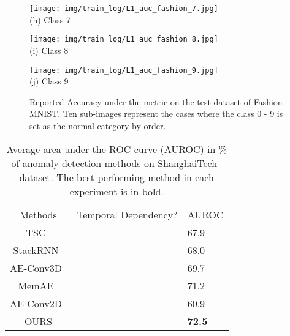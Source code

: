 \documentclass[journal]{IEEEtran}
\begin{document}
\begin{figure}[htbp]
\begin{minipage}[t]{0.24\textwidth}
\centering
\texttt{[image: img/train\_log/L1\_auc\_fashion\_7.jpg]}\\
(h) Class 7
\end{minipage}
\begin{minipage}[t]{0.24\textwidth}
\centering
\texttt{[image: img/train\_log/L1\_auc\_fashion\_8.jpg]}\\
(i) Class 8
\end{minipage}
\begin{minipage}[t]{0.24\textwidth}
\centering
\texttt{[image: img/train\_log/L1\_auc\_fashion\_9.jpg]}\\
(j) Class 9
\end{minipage}
\caption{Reported Accuracy under the  metric on the test dataset of Fashion-MNIST\cite{xiao2017fashion}. Ten sub-images represent the cases where the class 0 - 9 is set as the normal category by order.}
\label{fig:stable2}
\end{figure}

\renewcommand \arraystretch{0.95}
\begin{table}[!htb]
	\centering
	\caption{Average area under the ROC curve (AUROC) in \% of anomaly detection methods on ShanghaiTech~\cite{luo2017revisit} dataset. The best performing method in each experiment is in bold.}
	\small
	\begin{tabular}{cx{3cm}x{1.1cm}}
		\toprule
		Methods & Temporal Dependency? & AUROC \\
		\cmidrule(lr){1-1} \cmidrule(lr){2-2} \cmidrule(lr){3-3}
		TSC~\cite{luo2017revisit} & \checkmark & 67.9\\
		StackRNN~\cite{luo2017revisit} & \checkmark & 68.0\\
		AE-Conv3D~\cite{zhao2017spatio} & \checkmark & 69.7\\
		MemAE~\cite{gong2019memorizing} & \checkmark & 71.2\\
		\cmidrule(lr){1-1} \cmidrule(lr){2-2} \cmidrule(lr){3-3}
		AE-Conv2D~\cite{hasan2016learning} &  & 60.9\\
		OURS &  & \textbf{72.5}\\
		\bottomrule
		\end{tabular}
	\label{tal:shanghai}
\end{table}
\end{document}
